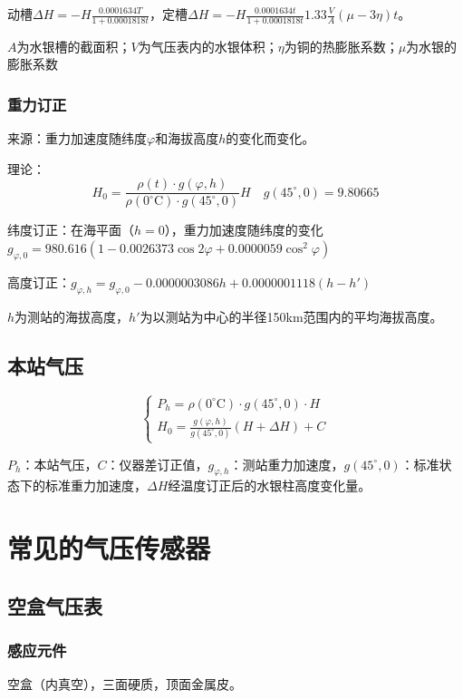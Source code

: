 \documentclass[UTF8,11pt]{ctexbook}
\begin{document}
动槽\(\Delta H=-H\frac{0.0001634T}{1+0.0001818t}\)，定槽\(\Delta H=-H\frac{0.0001634t}{1+0.0001818t}1.33\frac{V}{A}(\mu-3\eta)t\)。

\(A\)为水银槽的截面积；\(V\)为气压表内的水银体积；\(\eta\)为铜的热膨胀系数；\(\mu\)为水银的膨胀系数

\subsubsection{重力订正}

来源：重力加速度随纬度\(\varphi\)和海拔高度\(h\)的变化而变化。

理论：
\[
H_0=\frac{\rho(t)\cdot g(\varphi,h)}{\rho(0^\circ\mathrm{C})\cdot g(45^\circ,0)}H\quad g(45^\circ,0)=9.80665
\]

纬度订正：在海平面（\(h=0\)），重力加速度随纬度的变化\(g_{\varphi,0}=980.616(1-0.0026373\cos2\varphi+0.0000059\cos^2\varphi)\)

高度订正：\(g_{\varphi,h}=g_{\varphi,0}-0.0000003086h+0.0000001118(h-h')\)

\(h\)为测站的海拔高度，\(h'\)为以测站为中心的半径150km范围内的平均海拔高度。

\subsection{本站气压}
\[
\begin{cases}
P_h=\rho(0^\circ\mathrm{C})\cdot g(45^\circ,0)\cdot H\\
H_0=\frac{g(\varphi,h)}{g(45^\circ,0)}(H+\Delta H)+C
\end{cases}
\]

\(P_h\)：本站气压，\(C\)：仪器差订正值，\(g_{\varphi,h}\)：测站重力加速度，\(g(45^\circ,0)\)：标准状态下的标准重力加速度，\(\Delta H\)经温度订正后的水银柱高度变化量。

\section{常见的气压传感器}

\subsection{空盒气压表}

\subsubsection{感应元件}

空盒（内真空），三面硬质，顶面金属皮。
\end{document}
